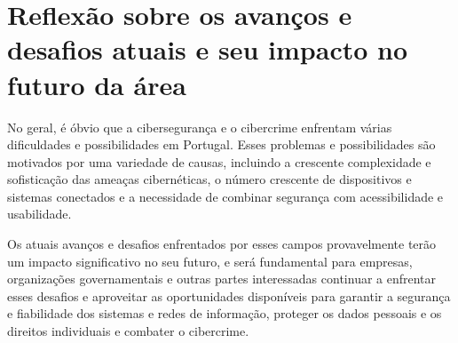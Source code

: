 \section{Reflexão sobre os avanços e desafios atuais e seu impacto no futuro da área}

No geral, é óbvio que a cibersegurança e o cibercrime enfrentam várias dificuldades e possibilidades em Portugal. Esses problemas e possibilidades são motivados por uma variedade de causas, incluindo a crescente complexidade e sofisticação das ameaças cibernéticas, o número crescente de dispositivos e sistemas conectados e a necessidade de combinar segurança com acessibilidade e usabilidade.

Os atuais avanços e desafios enfrentados por esses campos provavelmente terão um impacto significativo no seu futuro, e será fundamental para empresas, organizações governamentais e outras partes interessadas continuar a enfrentar esses desafios e aproveitar as oportunidades disponíveis para garantir a segurança e fiabilidade dos sistemas e redes de informação, proteger os dados pessoais e os direitos individuais e combater o cibercrime.
